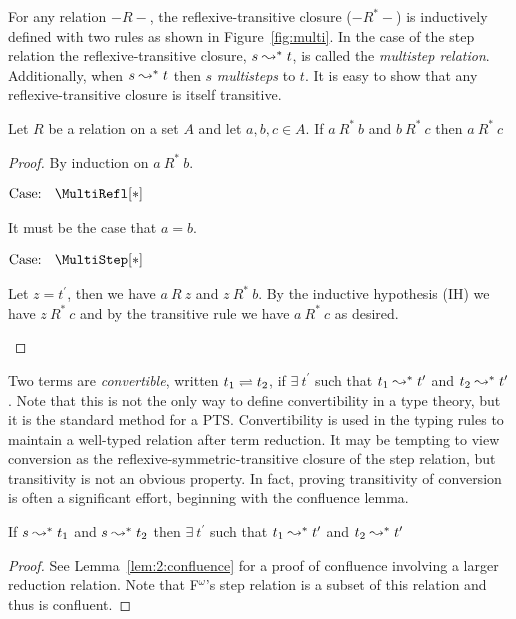 

For any relation $-R-$, the reflexive-transitive closure ($-R^*-$) is inductively defined with two rules as shown in Figure~\ref{fig:multi}.
In the case of the step relation the reflexive-transitive closure, $s \leadsto^* t$, is called the \textit{multistep relation}.
Additionally, when $s \leadsto^* t$ then $s$ \textit{multisteps} to $t$.
It is easy to show that any reflexive-transitive closure is itself transitive.

\begin{lemma}
    Let $R$ be a relation on a set $A$ and let $a, b, c \in A$. If $a\ R^*\ b$ and $b\ R^*\ c$ then $a\ R^*\ c$
\end{lemma}
\begin{proof}
    By induction on $a\ R^*\ b$.

    $\text{Case: }\begin{array}{c} \MultiRefl[*] \end{array}$
    \begin{proofcase}
        It must be the case that $a = b$.
    \end{proofcase}

    $\text{Case: }\begin{array}{c} \MultiStep[*] \end{array}$
    \begin{proofcase}
        Let $z = t^\prime$, then we have $a\ R\ z$ and $z\ R^*\ b$.
        By the inductive hypothesis (IH) we have $z\ R^*\ c$ and by the transitive rule we have $a\ R^*\ c$ as desired.
    \end{proofcase}
\end{proof}

Two terms are \textit{convertible}, written $t_1 \rightleftharpoons t_2$, if $\exists\ t^\prime$ such that $t_1 \leadsto^* t^\prime$ and $t_2 \leadsto^* t^\prime$.
Note that this is not the only way to define convertibility in a type theory, but it is the standard method for a PTS.
Convertibility is used in the typing rules to maintain a well-typed relation after term reduction.
It may be tempting to view conversion as the reflexive-symmetric-transitive closure of the step relation, but transitivity is not an obvious property.
In fact, proving transitivity of conversion is often a significant effort, beginning with the confluence lemma.

\begin{lemma}[Confluence]
    If $s \leadsto^* t_1$ and $s \leadsto^* t_2$ then $\exists\ t^\prime$ such that $t_1 \leadsto^* t^\prime$ and $t_2 \leadsto^* t^\prime$
\end{lemma}
\begin{proof}
    See Lemma~\ref{lem:2:confluence} for a proof of confluence involving a larger reduction relation.
    Note that F$^\omega$'s step relation is a subset of this relation and thus is confluent.
\end{proof}


